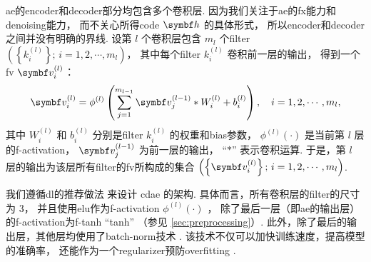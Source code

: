 \begin{figure}[htp]
  \centering
\end{figure}

\ac{ae}的\ac{encoder}和\ac{decoder}部分均包含多个卷积层.
因为我们关注于\ac{ae}的\ac{fx}能力和\ac{denoising}能力，
而不关心所得\ac{code} $\B{h}$ 的具体形式，
所以\ac{encoder}和\ac{decoder}之间并没有明确的界线.
设第 $l$ 个卷积层包含 $m_l$ 个\ac{filter}
$\left(\left\{ k_{i}^{(l)} \right\};\, i = 1, 2, \cdots, m_l \right)$，
其中每个\ac{filter} $k_{i}^{(l)}$ 卷积前一层的输出，
得到一个\ac{fv} $\B{v}_{i}^{(l)}$：
\begin{equation}
  \label{eq:conv}
  \B{v}_{i}^{(l)} = \phi^{(l)} \left( \sum_{j=1}^{m_{l-1}}
    \B{v}_{j}^{(l-1)} * W_i^{(l)} + b_i^{(l)} \right) ,
    \quad i = 1, 2, \cdots, m_{l} ,
\end{equation}
其中
$W_i^{(l)}$ 和 $b_i^{(l)}$ 分别是\ac{filter} $k_{i}^{(l)}$
的权重和\ac{bias}参数，
$\phi^{(l)}(\cdot)$ 是当前第 $l$ 层的\ac{f-activation}，
$\B{v}_{j}^{(l-1)}$ 为前一层的输出，
\enquote{$*$} 表示卷积运算.
于是，第 $l$ 层的输出为该层所有\ac{filter}的\ac{fv}所构成的集合
$\left(\left\{ \B{v}_{i}^{(l)} \right\};\, i = 1, 2, \cdots, m_l \right)$.

我们遵循\ac{dl}的推荐做法\cite{geron2017,suganuma2018} 来设计 \ac{cdae} 的架构.
具体而言，所有卷积层的\ac{filter}的尺寸为 3，
并且使用\ac{elu}作为\ac{f-activation} $\phi^{(l)}(\cdot)$ \cite{clevert2016}，
除了最后一层（即\ac{ae}的输出层）的\ac{f-activation}为\ac{f-tanh} \enquote{tanh}
（参见 \autoref{sec:preprocessing}）.
此外，除了最后的输出层，其他层均使用了\ac{batch-norm}技术 \cite{ioffe2015}.
该技术不仅可以加快训练速度，提高模型的准确率，
还能作为一个\ac{regularizer}预防\ac{overfitting} \cite{geron2017}.

